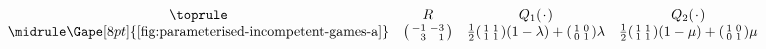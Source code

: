 
\renewcommand{\tabcolsep}{5pt}

\[
\begin{array}{ c c c c }
    \toprule
    & R & Q_1(\funcdot) & Q_2(\funcdot) \\ \midrule

    \Gape[8pt]{\text{\autoref{fig:parameterised-incompetent-games-a}}} &
        \begin{psmallmatrix*}[r] 
            -1 & -3 \\
            3 & 1 \\
        \end{psmallmatrix*} &
        \frac{1}{2}
        \begin{psmallmatrix}
            1 & 1 \\
            1 & 1 \\
        \end{psmallmatrix}
        (1 - \lambda) +
        \begin{psmallmatrix}
            1 & 0 \\
            0 & 1 \\
        \end{psmallmatrix}
        \lambda &
        \frac{1}{2}
        \begin{psmallmatrix}
            1 & 1 \\
            1 & 1 \\
        \end{psmallmatrix}
        (1 - \mu) +
        \begin{psmallmatrix}
            1 & 0 \\
            0 & 1 \\
        \end{psmallmatrix}
        \mu \\


\end{array}\]

